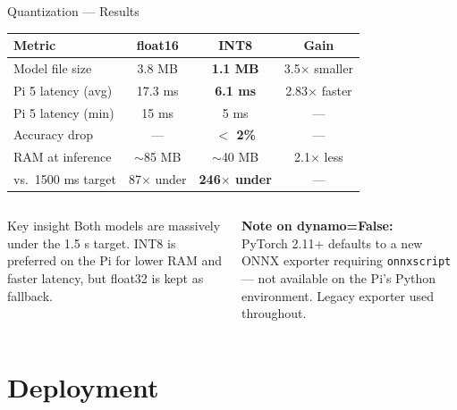 \documentclass[aspectratio=169]{beamer}
\begin{document}
\begin{frame}{Quantization — Results}
  \begin{center}
    \begin{tabular}{lccc}
      \toprule
      \textbf{Metric} & \textbf{float16} & \textbf{INT8} & \textbf{Gain} \\
      \midrule
      Model file size        & 3.8 MB  & \textbf{1.1 MB}   & 3.5$\times$ smaller \\
      Pi 5 latency (avg)     & 17.3 ms & \textbf{6.1 ms}   & 2.83$\times$ faster \\
      Pi 5 latency (min)     & 15 ms   & 5 ms              & — \\
      Accuracy drop          & —       & \textbf{$<$ 2\%}  & — \\
      RAM at inference       & $\sim$85 MB & $\sim$40 MB   & 2.1$\times$ less \\
      vs.\ 1500 ms target    & 87$\times$ under & \textbf{246$\times$ under} & — \\
      \bottomrule
    \end{tabular}
  \end{center}
  \vspace{0.3cm}
  \begin{columns}
      \begin{block}{Key insight}
        Both models are massively under the 1.5 s target. INT8 is preferred on the Pi for lower RAM and faster latency, but float32 is kept as fallback.
      \end{block}
      \textbf{Note on dynamo=False:}\\
      PyTorch 2.11+ defaults to a new ONNX exporter requiring \texttt{onnxscript} — not available on the Pi's Python environment. Legacy exporter used throughout.
  \end{columns}
\end{frame}

\section{Deployment}
\end{document}
